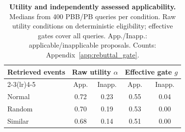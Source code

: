 \begin{table}[H]
\centering\small
\caption{\textbf{Utility and independently assessed applicability.} Medians from 400 PBB/PB queries per condition. Raw utility conditions on deterministic eligibility; effective gates cover all queries. App./Inapp.: applicable/inapplicable proposals. Counts: Appendix~\ref{app:rebuttal_gate}.}
\label{tab:gate_quality_main}
\begin{tabularx}{\linewidth}{@{}Xcccc@{}}\toprule
\multirow{2}{*}{Retrieved events} & \multicolumn{2}{c}{Raw utility $\alpha$} & \multicolumn{2}{c}{Effective gate $g$}\\
\cmidrule(lr){2-3}\cmidrule(lr){4-5}
& App. & Inapp. & App. & Inapp.\\\midrule
Normal & 0.72 & 0.23 & 0.55 & 0.04\\
Random & 0.70 & 0.19 & 0.53 & 0.00\\
Similar & 0.68 & 0.14 & 0.51 & 0.00\\\bottomrule
\end{tabularx}
\end{table}

